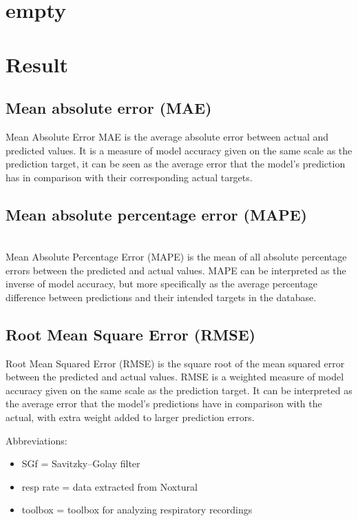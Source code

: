 \chapter{empty}
\chapter*{Result}

\section{Mean absolute error (MAE)}
Mean Absolute Error MAE is the average absolute error between actual and predicted values.  It is a measure of model accuracy given on the same scale as the prediction target, it can be seen as the average error that the model's prediction has in comparison with their corresponding actual targets.


\section {Mean absolute percentage error (MAPE)} \\
Mean Absolute Percentage Error (MAPE) is the mean of all absolute percentage errors between the predicted and actual values.
MAPE can be interpreted as the inverse of model accuracy, but more specifically as the average percentage difference between predictions and their intended targets in the database.


 \section{Root Mean Square Error (RMSE) }
 Root Mean Squared Error (RMSE) is the square root of the mean squared error between the predicted and actual values.
 RMSE is a weighted measure of model accuracy given on the same scale as the prediction target. It can be interpreted as the average error that the model’s predictions have in comparison with the actual, with extra weight added to larger prediction errors.
 
 Abbreviations:
\begin{itemize}
    \item SGf = Savitzky–Golay filter
    \item resp rate = data extracted from Noxtural
    \item toolbox = toolbox for analyzing respiratory recordings
         \cite{Noto2018AutomatedToolbox}
\end{itemize}

